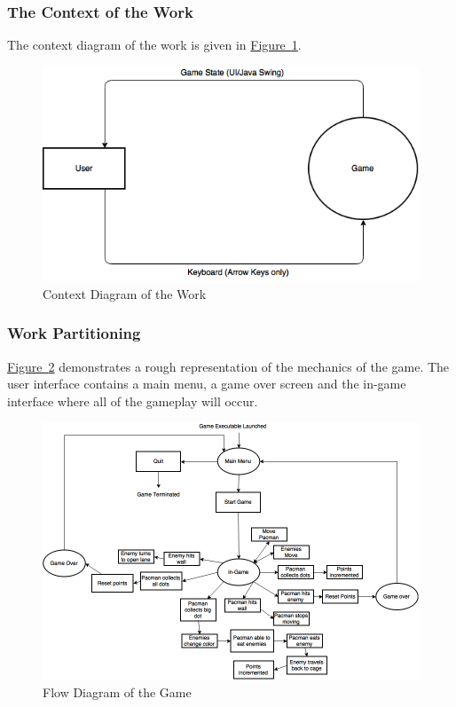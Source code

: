 \documentclass[12pt, titlepage]{article}
\begin{document}
\subsubsection{The Context of the Work}
The context diagram of the work is given in \hyperref[fig:gamecontext]{Figure~\ref*{fig:gamecontext}}.
\begin{figure}[H]
\includegraphics[width=\textwidth]{gamecontext}
\caption{Context Diagram of the Work} \label{fig:gamecontext}
\end{figure}

\subsubsection{Work Partitioning}
\hyperref[fig:flow-3]{Figure~\ref*{fig:flow-3}} demonstrates a rough representation of the mechanics of the game. The user interface contains a main menu, a game over screen and the in-game interface where all of the gameplay will occur.

\begin{figure}[H]
\includegraphics[width=\textwidth]{flow-3}
\caption{Flow Diagram of the Game} \label{fig:flow-3}
\end{figure}
\end{document}

